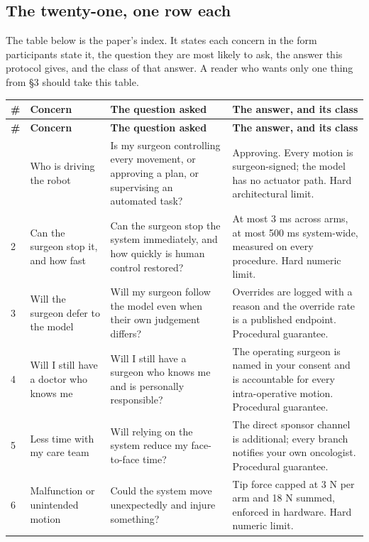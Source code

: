 \subsection{The twenty-one, one row each}

The table below is the paper's index. It states each concern in the form
participants state it, the question they are most likely to ask, the answer this
protocol gives, and the class of that answer. A reader who wants only one thing
from \S 3 should take this table.

\vspace{0.30em}

\begin{xltabular}{\textwidth}{C{0.7cm} L{3.4cm} L{4.2cm} Y}
\toprule
\textbf{\#} & \textbf{Concern} & \textbf{The question asked} & \textbf{The answer, and its class} \\
\midrule
\endfirsthead
\toprule
\textbf{\#} & \textbf{Concern} & \textbf{The question asked} & \textbf{The answer, and its class} \\
\midrule
\endhead
\bottomrule
\endfoot
\bottomrule
{} & Who is driving the robot & Is my surgeon controlling every movement, or approving a plan, or supervising an automated task? & Approving. Every motion is surgeon-signed; the model has no actuator path. Hard architectural limit. \\
2 & Can the surgeon stop it, and how fast & Can the surgeon stop the system immediately, and how quickly is human control restored? & At most 3 ms across arms, at most 500 ms system-wide, measured on every procedure. Hard numeric limit. \\
3 & Will the surgeon defer to the model & Will my surgeon follow the model even when their own judgement differs? & Overrides are logged with a reason and the override rate is a published endpoint. Procedural guarantee. \\
4 & Will I still have a doctor who knows me & Will I still have a surgeon who knows me and is personally responsible? & The operating surgeon is named in your consent and is accountable for every intra-operative motion. Procedural guarantee. \\
5 & Less time with my care team & Will relying on the system reduce my face-to-face time? & The direct sponsor channel is additional; every branch notifies your own oncologist. Procedural guarantee. \\
6 & Malfunction or unintended motion & Could the system move unexpectedly and injure something? & Tip force capped at 3 N per arm and 18 N summed, enforced in hardware. Hard numeric limit. \\

\end{xltabular}

